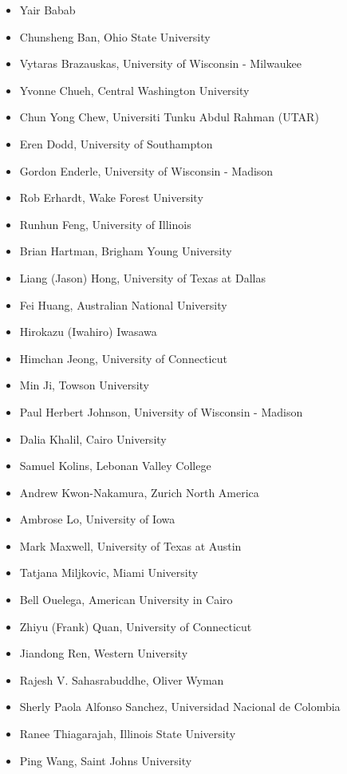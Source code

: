 \documentclass[
]{book}
\providecommand{\tightlist}{%
  \setlength{\itemsep}{0pt}\setlength{\parskip}{0pt}}
\begin{document}
\begin{itemize}
\tightlist
\item
  Yair Babab
\item
  Chunsheng Ban, Ohio State University
\item
  Vytaras Brazauskas, University of Wisconsin - Milwaukee
\item
  Yvonne Chueh, Central Washington University
\item
  Chun Yong Chew, Universiti Tunku Abdul Rahman (UTAR)
\item
  Eren Dodd, University of Southampton
\item
  Gordon Enderle, University of Wisconsin - Madison
\item
  Rob Erhardt, Wake Forest University
\item
  Runhun Feng, University of Illinois
\item
  Brian Hartman, Brigham Young University
\item
  Liang (Jason) Hong, University of Texas at Dallas
\item
  Fei Huang, Australian National University
\item
  Hirokazu (Iwahiro) Iwasawa
\item
  Himchan Jeong, University of Connecticut
\item
  Min Ji, Towson University
\item
  Paul Herbert Johnson, University of Wisconsin - Madison
\item
  Dalia Khalil, Cairo University
\item
  Samuel Kolins, Lebonan Valley College
\item
  Andrew Kwon-Nakamura, Zurich North America
\item
  Ambrose Lo, University of Iowa
\item
  Mark Maxwell, University of Texas at Austin
\item
  Tatjana Miljkovic, Miami University
\item
  Bell Ouelega, American University in Cairo
\item
  Zhiyu (Frank) Quan, University of Connecticut
\item
  Jiandong Ren, Western University
\item
  Rajesh V. Sahasrabuddhe, Oliver Wyman
\item
  Sherly Paola Alfonso Sanchez, Universidad Nacional de Colombia
\item
  Ranee Thiagarajah, Illinois State University
\item
  Ping Wang, Saint Johns University

\end{itemize}
\end{document}
